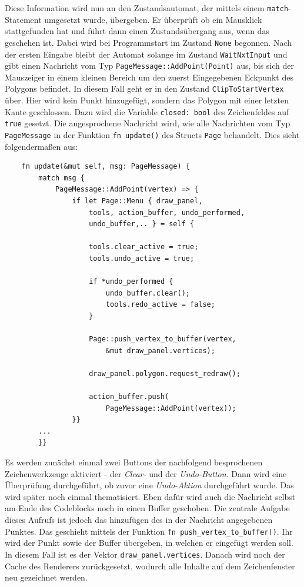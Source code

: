 Diese Information wird nun an den Zustandsautomat, der mittels einem \lstinline{match}-Statement umgesetzt wurde, übergeben. Er überprüft ob ein Mausklick stattgefunden hat und führt dann einen Zustandsübergang aus, wenn das geschehen ist.
Dabei wird bei Programmstart im Zustand \lstinline{None} begonnen. Nach der ersten Eingabe bleibt der Automat solange im Zustand \lstinline{WaitNxtInput} und gibt einen Nachricht vom Typ \lstinline{PageMessage::AddPoint(Point)} aus, bis sich der Mauszeiger in einem 
kleinen Bereich um den zuerst Eingegebenen Eckpunkt des Polygons befindet. 
In diesem Fall geht er in den Zustand \lstinline{ClipToStartVertex} über. Hier wird kein Punkt hinzugefügt, sondern das Polygon mit einer letzten Kante geschlossen. Dazu wird die Variable \lstinline{closed: bool} des Zeichenfeldes auf \lstinline{true} 
gesetzt. 
Die angesprochene Nachricht wird, wie alle Nachrichten vom Typ \lstinline{PageMessage} in der Funktion \lstinline{fn update()} des Structs \lstinline{Page} behandelt. Dies sieht folgendermaßen aus:

\begin{lstlisting}
    fn update(&mut self, msg: PageMessage) {
        match msg {
            PageMessage::AddPoint(vertex) => {
                if let Page::Menu { draw_panel, 
                    tools, action_buffer, undo_performed, 
                    undo_buffer,.. } = self {

                    tools.clear_active = true;
                    tools.undo_active = true;
                    
                    if *undo_performed {
                        undo_buffer.clear();
                        tools.redo_active = false;
                    }

                    Page::push_vertex_to_buffer(vertex, 
                        &mut draw_panel.vertices);            
                    
                    draw_panel.polygon.request_redraw();

                    action_buffer.push(
                        PageMessage::AddPoint(vertex));     
                }}
        ...
        }}
\end{lstlisting}
Es werden zunächst einmal zwei Buttons der nachfolgend besprochenen Zeichenwerkzeuge aktiviert - der \emph{Clear-} und der \emph{Undo-Button}. Dann wird eine Überprüfung durchgeführt, ob zuvor eine \emph{Undo-Aktion} 
durchgeführt wurde. Das wird später noch einmal thematisiert. Eben dafür wird auch die Nachricht selbst am Ende des Codeblocks noch in einen Buffer geschoben.
Die zentrale Aufgabe dieses Aufrufs ist jedoch das hinzufügen des in der Nachricht angegebenen Punktes. Das geschieht mittels der Funktion \lstinline{fn push_vertex_to_buffer()}. Ihr wird 
der Punkt sowie der Buffer übergeben, in welchen er eingefügt werden soll. In diesem Fall ist es der Vektor \lstinline{draw_panel.vertices}. Danach wird noch der Cache des Renderers zurückgesetzt, wodurch alle Inhalte auf dem 
Zeichenfenster neu gezeichnet werden.\linebreak

